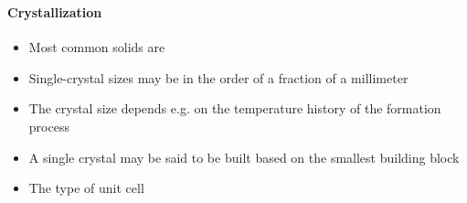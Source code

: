 \begin{frame}
\frametitle{\texorpdfstring{\culine[\sectiontitleulinecolor]{\sectiontitle}}{\sectiontitle} }
\framesubtitle{Crystallization}

\begin{itemize}
	\item Most common solids are 

\item Single-crystal sizes may be in the order of a fraction of a millimeter 

\item The crystal size depends e.g. on the temperature history of the formation process

\item A single crystal may be said to be built based on the smallest building block

\item The type of unit cell 
\end{itemize}

\endofslide 
\end{frame}

